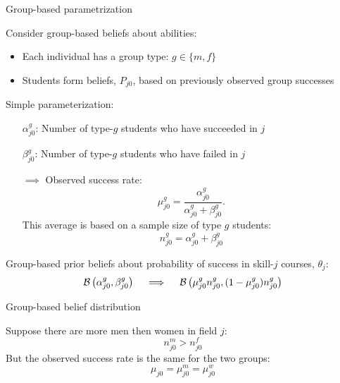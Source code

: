 \begin{frame}{Group-based parametrization}



Consider group-based beliefs about abilities:
\begin{itemize}
    \item Each individual has a group type: $g \in \{m, f\}$

    \item Students form beliefs, $P_{j0}$, based on previously observed group successes
\end{itemize}

\vspace{2ex}
Simple parameterization:
\begin{itemize}
    \item [$\alpha_{j0}^g$: ] Number of type-$g$ students who have succeeded in $j$ 
    \item [$\beta_{j0}^g$: ] Number of type-$g$ students who have failed in $j$

    \item [$\implies$] Observed success rate:
    \begin{equation*}
    \mu_{j0}^g = 
      \frac{\alpha_{j0}^g}{\alpha_{j0}^g + \beta_{j0}^g}.
\end{equation*}
This average is based on a sample size of type $g$ students:
\begin{equation*}
    n_{j0}^g = \alpha_{j0}^g + \beta_{j0}^g
 \end{equation*}
\end{itemize}

\vspace{2ex}
Group-based prior beliefs about probability of success in skill-$j$ courses, $\theta_j$:
\begin{equation*}
    \mathcal{B} \left( \alpha_{j0}^g, \beta_{j0}^g \right) \quad \implies \quad
    \mathcal{B} \left( \mu_{j0}^g n_{j0}^g, (1 - \mu_{j0}^g) n_{j0}^g \right)
\end{equation*}



\end{frame}

\begin{frame}{Group-based belief distribution}

Suppose there are more men then women in field $j$: 
\begin{equation*}
  n_{j0}^m > n_{j0}^f
\end{equation*}
But the observed success rate is the same for the two groups:
\begin{equation*}
    \mu_{j0} = \mu_{j0}^m = \mu_{j0}^w
\end{equation*}

\begin{figure}

\end{figure}


\end{frame}


